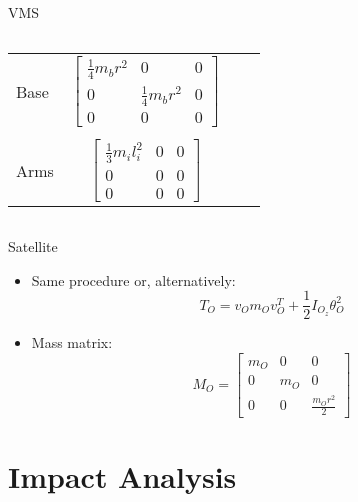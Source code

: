 \begin{frame}{VMS}
\begin{columns}
\begin{column}{0.5\textwidth}
\begin{table}
\begin{center}
\begin{tabular}{lccc}
            \hline
            Base&$\begin{bmatrix}
              \frac{1}{4}m_br^2&0&0\\
              0&\frac{1}{4}m_br^2&0\\
              0&0&0
            \end{bmatrix}$\\
            \\
            Arms&$\begin{bmatrix}
              \frac{1}{3}m_il_i^2&0&0\\
              0&0&0\\
              0&0&0
            \end{bmatrix}$\\
            \hline
            \end{tabular}
            \end{center}
            \end{table}
    \end{column}
\end{columns}
\end{frame}

\begin{frame}{Satellite}
    \begin{itemize}
        \item Same procedure or, alternatively:
        \begin{equation}
            T_O=v_Om_Ov_O^T+\frac{1}{2}I_{O_z}\theta_O^2
          \end{equation}
        \item Mass matrix: 
        \begin{equation}
            M_O=\begin{bmatrix}
                m_O&0&0\\
                0&m_O&0\\
                0&0&\frac{m_Or^2}{2}
              \end{bmatrix}
        \end{equation}
    \end{itemize}
\end{frame}

\section{Impact Analysis}

